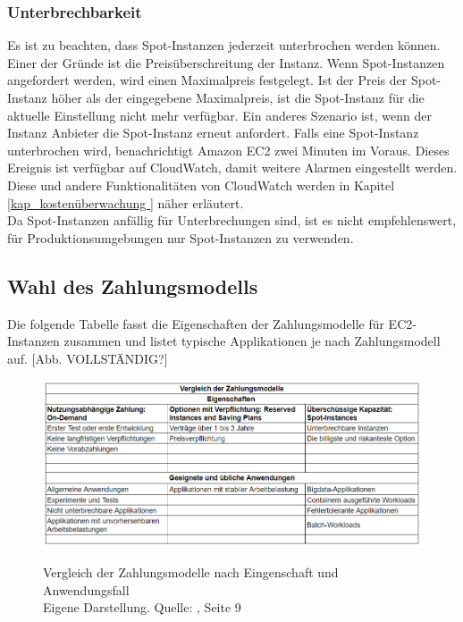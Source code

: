 \subsubsection*{Unterbrechbarkeit}
Es ist zu beachten, dass Spot-Instanzen jederzeit unterbrochen werden können. Einer der Gründe ist die Preisüberschreitung der Instanz. Wenn Spot-Instanzen angefordert werden, wird einen Maximalpreis festgelegt. Ist der Preis der Spot-Instanz höher als der eingegebene Maximalpreis, ist die Spot-Instanz für die aktuelle Einstellung nicht mehr verfügbar. Ein anderes Szenario ist, wenn der Instanz Anbieter die Spot-Instanz erneut anfordert. Falls eine Spot-Instanz unterbrochen wird, benachrichtigt Amazon EC2 zwei Minuten im Voraus. Dieses Ereignis ist verfügbar auf CloudWatch, damit weitere Alarmen eingestellt werden. Diese und andere Funktionalitäten von CloudWatch werden in Kapitel \ref{kap_kostenüberwachung } näher erläutert.
\\
Da Spot-Instanzen anfällig für Unterbrechungen sind, ist es nicht empfehlenswert, für Produktionsumgebungen nur Spot-Instanzen zu verwenden.

\subsection{Wahl des Zahlungsmodells} \label{sssec:num2.4}
Die folgende Tabelle fasst die Eigenschaften der Zahlungsmodelle für EC2-Instanzen zusammen und listet typische Applikationen je nach Zahlungsmodell auf.
[Abb. VOLLSTÄNDIG?]
\begin{figure}[h!]
    \centering
    \includegraphics[scale=0.63]{sources/Vergleich_der_Zahlungsmodelle}\label{fig:Vergleich_der_Zahlungsmodelle}\\
    \caption[Vergleich der Zahlungsmodelle]{}
    \label{fig:Vergleich_der_Zahlungsmodelle}  Vergleich der Zahlungsmodelle nach Eingenschaft und Anwendungsfall\\
    Eigene Darstellung. Quelle: {\cite{AMZ02, AMZ07, AMZ11, AMZ19}},
    {\cite{PS1} Seite 9}
  \end{figure}

